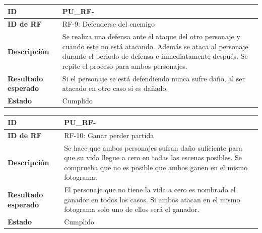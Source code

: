 \begin{center}
	\begin{tabular}{ | p{3cm} | p{10cm} | } 
		\hline
		
		\textbf{ID} & PU\_RF-\arabic{contador_pruebas_funcionales}
		{contador_pruebas_funcionales} \\
		
		\hline 
		\textbf{ID de RF} &
		RF-9: Defenderse del enemigo\\ 
		
		\hline
		\textbf{Descripción} & 
		Se realiza una defensa ante el ataque del otro personaje y cuando este no está atacando. Además se ataca al personaje durante el periodo de defensa e inmediatamente después. Se repite el proceso para ambos personajes.\\
		
		\hline 
		\textbf{Resultado esperado} &
		Si el personaje se está defendiendo nunca sufre daño, al ser atacado en otro caso sí es dañado.\\ 
		
		\hline 
		\textbf{Estado} &
		Cumplido\\ 
		
		\hline
	\end{tabular}
\end{center}

\begin{center}
	\begin{tabular}{ | p{3cm} | p{10cm} | } 
		\hline
		
		\textbf{ID} & PU\_RF-\arabic{contador_pruebas_funcionales}
		{contador_pruebas_funcionales} \\
		
		\hline 
		\textbf{ID de RF} &
		RF-10: Ganar perder partida\\ 
		
		\hline
		\textbf{Descripción} & 
		Se hace que ambos personajes sufran daño suficiente para que su vida llegue a cero en todas las escenas posibles. Se comprueba que no es posible que ambos ganen en el mismo fotograma.\\
		
		\hline 
		\textbf{Resultado esperado} &
		El personaje que no tiene la vida a cero es nombrado el ganador en todos los casos. Si ambos atacan en el mismo fotograma solo uno de ellos será el ganador.\\ 
		
		\hline 
		\textbf{Estado} &
		Cumplido\\ 
		
		\hline
	\end{tabular}
\end{center}

